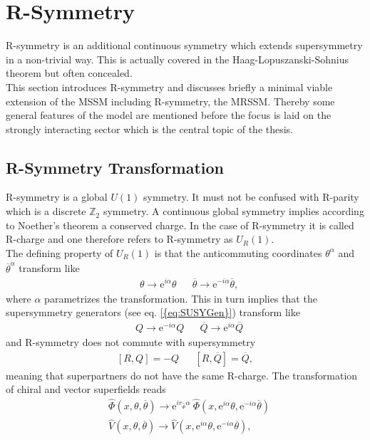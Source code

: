 \section{R-Symmetry}
R-symmetry is an additional continuous symmetry which extends  supersymmetry in a non-trivial way. This is actually covered in the Haag-Lopuszanski-Sohnius theorem \cite{Haag:1974qh} but often concealed.\\
This section introduces R-symmetry and discusses briefly a minimal viable extension of the MSSM including R-symmetry, the MRSSM. Thereby some general features of the model are mentioned before the focus is laid on the strongly interacting sector which is the central topic of the thesis. 


\subsection{R-Symmetry Transformation}
R-symmetry is a global $U(1)$ symmetry. It must not be confused with R-parity which is a discrete $\mathbb{Z}_2$ symmetry. A continuous global symmetry implies according to Noether's theorem a conserved charge. In the case of R-symmetry it is called R-charge and one therefore refers to R-symmetry as $U_R(1)$.\\
The defining property of $U_R(1)$ is that the anticommuting coordinates $\theta^\alpha$ and $\overline{\theta}^{\dot{\alpha}}$ transform like
\begin{align}
&\theta \to \mathrm{e}^{i\alpha}\theta && \overline{\theta} \to \mathrm{e}^{-i\alpha}\overline{\theta},
\end{align}
where $\alpha$ parametrizes the transformation. This in turn implies that the supersymmetry generators (see eq. \ref{{eq:SUSYGen}}) transform like
\begin{align}
& Q \to \mathrm{e}^{-i\alpha} Q && \overline{Q} \to \mathrm{e}^{i\alpha}\overline{Q}
\end{align}
and R-symmetry does not commute with supersymmetry 
\begin{align}
\left[ R,Q \right] = -Q && \left[ R,\overline{Q} \right] = \overline{Q},
\end{align}
meaning that superpartners do not have the same R-charge. The transformation of chiral and vector superfields reads
\begin{align}
& \hat{\Phi}(x,\theta,\overline{\theta}) \to \mathrm{e}^{ir_{\hat{\Phi}}\alpha}\ \hat{\Phi}(x,\mathrm{e}^{i\alpha}\theta,\mathrm{e}^{-i\alpha}\overline{\theta})\nonumber\\
&\hat{V}(x,\theta,\overline{\theta}) \to  \hat{V}(x,\mathrm{e}^{i\alpha}\theta,\mathrm{e}^{-i\alpha}\overline{\theta}),
\end{align}
